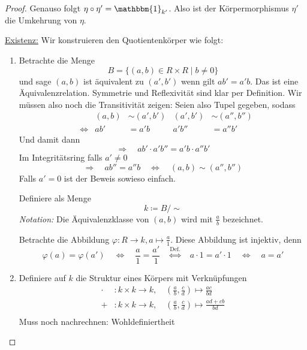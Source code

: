 \documentclass[a4paper,12pt,numbers=noenddot,parskip=full]{scrartcl}
\newcommand{\heading}{\underline}
\theoremstyle{dotless}
\theoremstyle{remark}
\begin{document}
\begin{proof}
		Genauso folgt $\eta \circ \eta'= \mathbbm{1}_{k'}$. Also ist der Körpermorphismus $\eta'$ die Umkehrung von $\eta$.
		
		\heading{Existenz:} Wir konstruieren den Quotientenkörper wie folgt:
		\begin{enumerate}
			\item Betrachte die Menge
			\begin{equation*}
				B = \{ (a,b) \in R \times R \mid b \neq 0 \}
			\end{equation*}
			und sage $(a,b)$ ist äquivalent zu $(a', b')$ wenn gilt $a b' = a' b$. Das ist eine Äquivalenzrelation. Symmetrie und Reflexivität sind klar per Definition. Wir müssen also noch die Transitivität zeigen: Seien also Tupel gegeben, sodass
			\begin{align*}
				&&(a,b) &\sim (a', b') & (a', b') &\sim (a'',b'') \\
				&\Leftrightarrow& ab' &= a'b & a'b'' &= a''b'
			\end{align*}
			Und damit dann
			\begin{equation*}
				\Rightarrow\quad ab' \cdot a'b'' = a' b \cdot a'' b'
			\end{equation*}
			Im Integritätsring falls $a' \neq 0$
			\begin{equation*}
				\Rightarrow\quad a b'' = a'' b \quad\Leftrightarrow\quad (a,b) \sim (a'',b'')
			\end{equation*}
			Falls $a' = 0$ ist der Beweis sowieso einfach.
			
			Definiere als Menge
			\begin{equation*}
				k \coloneqq B / \sim
			\end{equation*}
			\textit{Notation:} Die Äquivalenzklasse von $(a,b)$ wird mit $\frac{a}{b}$ bezeichnet.
			
			Betrachte die Abbildung
			$
				\varphi: R \to k, a \mapsto \frac{a}{1}
			$.
			Diese Abbildung ist injektiv, denn 
			\begin{equation*}
				\varphi(a) = \varphi(a') \quad\Leftrightarrow\quad \frac{a}{1} = \frac{a'}{1} \overset{\text{Def.}}{\quad\Leftrightarrow\quad} a \cdot 1 = a' \cdot 1 \quad\Leftrightarrow\quad a = a'
			\end{equation*}
			\item Definiere auf $k$ die Struktur eines Körpers mit Verknüpfungen
			\begin{align*}
				\cdot&: k \times k \to k, \quad \left(\frac{a}{b}, \frac{c}{d}\right) \mapsto \frac{ac}{bd} \\
				+&: k \times k \to k, \quad \left(\frac{a}{b}, \frac{c}{d}\right) \mapsto \frac{ad + cb}{bd} \\
			\end{align*}
			Muss noch nachrechnen: Wohldefiniertheit
			

\end{enumerate}
\end{proof}
\end{document}

